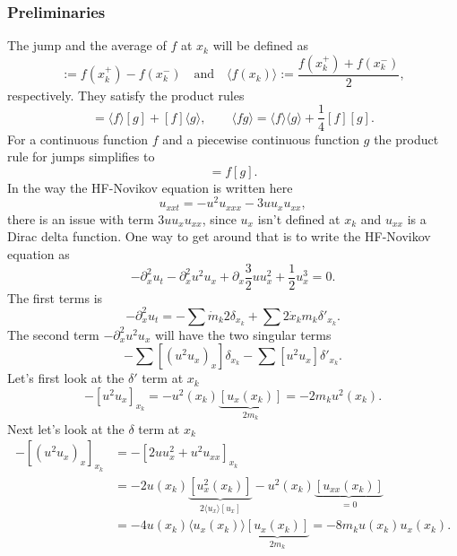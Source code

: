 \documentclass[english,master]{liumaiex}
\theoremstyle{plain}
\theoremstyle{definition}
\begin{document}
\subsubsection*{Preliminaries}

The jump and the average of $f$ at $x_k$ will be defined as
\begin{equation}
	[f(x_k)] := f(x_k^+) - f(x_k^-) \quad \text{and} \quad \langle f(x_k)\rangle := \frac{f(x_k^+) + f(x_k^-)}{2},
\end{equation}
respectively. They satisfy the product rules
\begin{equation}
	[fg] = \langle f\rangle[g] + [f]\langle g\rangle, \quad \quad \langle fg\rangle = \langle f\rangle\langle g\rangle + \frac{1}{4}[f][g].
\end{equation}
%
For a continuous function $f$ and a piecewise continuous function $g$ the product rule for jumps simplifies to
\begin{equation}
	[fg] = f[g].
\end{equation}
In the way the HF-Novikov equation is written here
\begin{equation}
	u_{xxt} = -u^2u_{xxx} - 3uu_xu_{xx},
\end{equation}
there is an issue with term $3uu_xu_{xx}$, since $u_x$ isn't defined at $x_k$ and $u_{xx}$ is a Dirac delta function. One way to get around that is to write the HF-Novikov equation as
\begin{equation}
	-\partial_x^2 u_t - \partial_x^2 u^2 u_x + \partial_x \frac{3}{2} u u_x^2 + \frac{1}{2}u_x^3 = 0.
\end{equation}
%
The first terms is 
\begin{equation}
	-\partial_x^2 u_t = - \sum \dot{m}_k 2 \delta_{x_k} + \sum 2 \dot{x}_k m_k \delta'_{x_k}.
\end{equation}
%
The second term $-\partial_x^2 u^2 u_x$ will have the two singular terms
\begin{equation}
	- \sum [(u^2 u_x)_x] \delta_{x_k} - \sum [u^2 u_x] \delta'_{x_k}.
\end{equation}
%
Let's first look at the $\delta'$ term at $x_k$
\begin{equation}
	- [u^2 u_x]_{x_k} = - u^2(x_k) \underbrace{[u_x(x_k)]}_{2m_k} = -2 m_k u^2(x_k).
\end{equation}
Next let's look at the $\delta$ term at $x_k$
\begin{equation}
\begin{aligned}
	- [(u^2 u_x)_x]_{x_k} &= -[2u u_x^2 + u^2 u_{xx}]_{x_k} \\
		&= - 2u(x_k) \underbrace{[u_x^2(x_k)]}_{2\langle u_x \rangle [u_x]}
		- u^2(x_k) \underbrace{[u_{xx}(x_k)]}_{=0} \\
		&= -4u(x_k) \langle u_x(x_k) \rangle \underbrace{[u_x(x_k)]}_{2m_k} = -8m_k u(x_k) u_x(x_k).
\end{aligned}
\end{equation}
\end{document}
